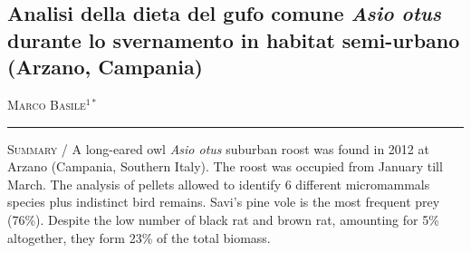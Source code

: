 \setcounter{figure}{0}
\setcounter{table}{0}

\begin{adjustwidth}{-3.5cm}{0cm}
\pagestyle{CIOpage}
\chapter*[Dieta del gufo comune in habitat semi-urbano (Arzano,
Campania)]{Analisi della dieta del gufo comune \textbf{\textit{Asio
otus}}\textbf{ durante lo svernamento in habitat semi-urbano (Arzano,
Campania)}}


\textsc{Marco Basile}$^{1*}$ \\

\noindent\color{MUSEBLUE}\rule{27cm}{2pt}
\vspace{1cm}
\end{adjustwidth}



{\small
\noindent \textsc{\color{MUSEBLUE} Summary} / A long-eared owl \textit{Asio otus}\textbf{ }suburban roost was found in
2012 at Arzano (Campania, Southern Italy). The roost was occupied from
January till March. The analysis of pellets allowed to identify 6
different micromammals species plus indistinct bird remains.
Savi{\textquoteright}s pine vole is the most frequent prey (76\%).
Despite the low number of black rat and brown rat, amounting for 5\%
altogether, they form 23\% of the total biomass.
}
